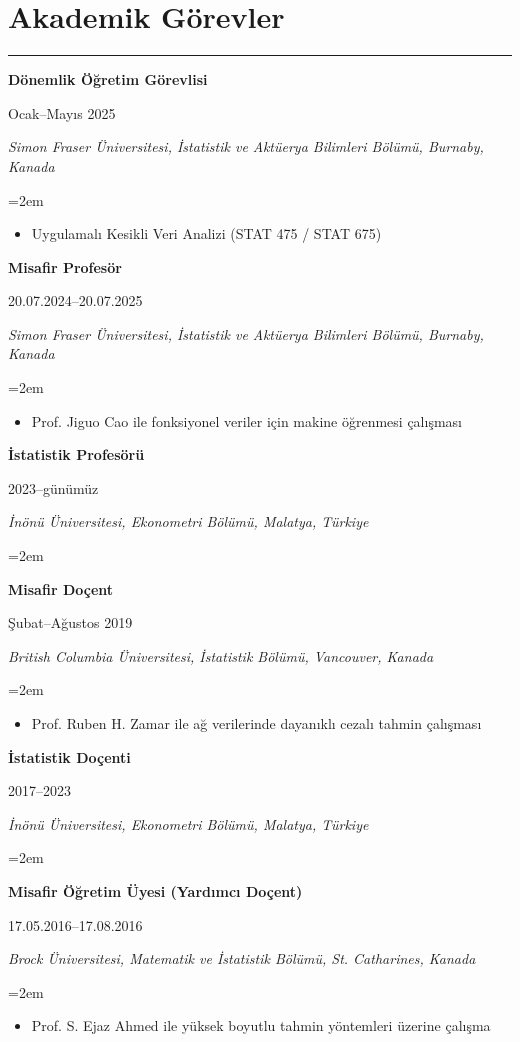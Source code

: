 \documentclass[10pt,a4paper]{article}
\newcommand{\sepspace}{\vspace*{0.65em}}		%
\newcommand{\NewPart}[2]{%
	\Needspace{7\baselineskip}%
	\vspace{0.45em}%
	\section*{\sffamily\large\bfseries\color{MidnightBlue}#1 #2}%
	\vspace{-0.7em}\noindent\color{MidnightBlue}\rule{\textwidth}{0.55pt}\color{Black}\vspace{0.25em}}
\newcommand{\EducationEntry}[4]{
		\noindent \textbf{#1} \hfill      %
		\parbox{11.5em}{%
			\hfill\color{Black}#2} \par  %
		\noindent \textit{#3} \par        %
		\noindent\hangindent=2em\hangafter=0 \small #4 %
		\normalsize \par}
\begin{document}
\NewPart{Akademik Görevler}{}

\EducationEntry{Dönemlik Öğretim Görevlisi}{Ocak--Mayıs 2025}{Simon Fraser Üniversitesi, İstatistik ve Aktüerya Bilimleri Bölümü, Burnaby, Kanada}
{\begin{itemize}\item{Uygulamalı Kesikli Veri Analizi (STAT 475 / STAT 675)}\end{itemize}}
\sepspace

\EducationEntry{Misafir Profesör}{20.07.2024--20.07.2025}{Simon Fraser Üniversitesi, İstatistik ve Aktüerya Bilimleri Bölümü, Burnaby, Kanada}
{\begin{itemize}\item{Prof. Jiguo Cao ile fonksiyonel veriler için makine öğrenmesi çalışması}\end{itemize}}


\sepspace
\EducationEntry{İstatistik Profesörü}{2023--günümüz}{İnönü Üniversitesi, Ekonometri Bölümü, Malatya, Türkiye}{}

\sepspace
\EducationEntry{Misafir Doçent}{Şubat--Ağustos 2019}{British Columbia Üniversitesi, İstatistik Bölümü, Vancouver, Kanada}
{\begin{itemize}\item{Prof. Ruben H. Zamar ile ağ verilerinde dayanıklı cezalı tahmin çalışması}\end{itemize}}

\sepspace
\EducationEntry{İstatistik Doçenti}{2017--2023}{İnönü Üniversitesi, Ekonometri Bölümü, Malatya, Türkiye}{}

\sepspace
\EducationEntry{Misafir Öğretim Üyesi (Yardımcı Doçent)}{17.05.2016--17.08.2016}{Brock Üniversitesi, Matematik ve İstatistik Bölümü, St. Catharines, Kanada}
{\begin{itemize}\item{Prof. S. Ejaz Ahmed ile yüksek boyutlu tahmin yöntemleri üzerine çalışma}\end{itemize}}



\end{document}
